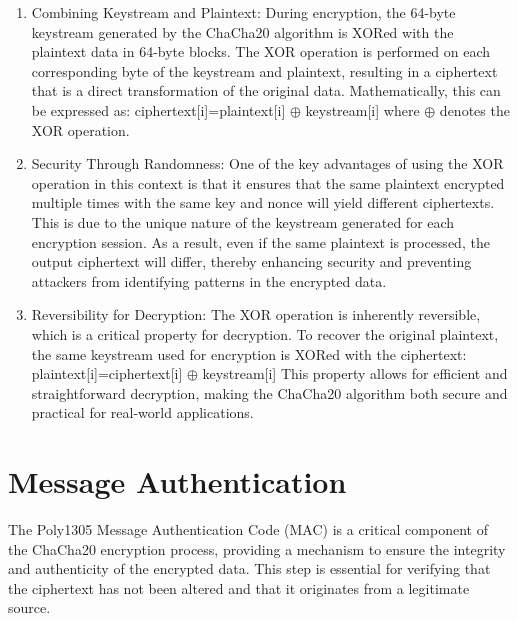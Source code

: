 \documentclass[a4paper,12pt]{report}
\begin{document}
\begin{enumerate}
    \begin{enumerate}
    \item Combining Keystream and Plaintext: During encryption, the 64-byte keystream generated by the ChaCha20 algorithm is XORed with the plaintext data in 64-byte blocks.
    The XOR operation is performed on each corresponding byte of the keystream and plaintext, resulting in a ciphertext that is a direct transformation of the original data.
    Mathematically, this can be expressed as:
    ciphertext[i]=plaintext[i] $\oplus$ keystream[i]
    where $\oplus$ denotes the XOR operation.
    \item Security Through Randomness: One of the key advantages of using the XOR operation in this context is that it ensures that the same plaintext encrypted multiple times with the same key and nonce will yield different ciphertexts.
    This is due to the unique nature of the keystream generated for each encryption session.
    As a result, even if the same plaintext is processed, the output ciphertext will differ, thereby enhancing security and preventing attackers from identifying patterns in the encrypted data.
    \item Reversibility for Decryption: The XOR operation is inherently reversible, which is a critical property for decryption.
    To recover the original plaintext, the same keystream used for encryption is XORed with the ciphertext:
    plaintext[i]=ciphertext[i] $\oplus$ keystream[i]
    This property allows for efficient and straightforward decryption, making the ChaCha20 algorithm both secure and practical for real-world applications.
    \end{enumerate}
\end{enumerate}

\section{Message Authentication}
    The Poly1305 Message Authentication Code (MAC) is a critical component of the ChaCha20 encryption process, providing a mechanism to ensure the integrity and authenticity of the encrypted data.
    This step is essential for verifying that the ciphertext has not been altered and that it originates from a legitimate source.
\end{document}
